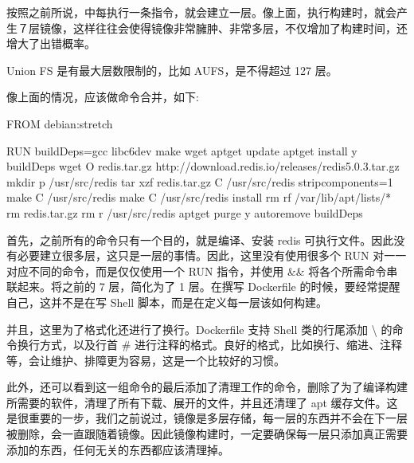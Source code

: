 \documentclass[letterpaper,10pt,english]{sphinxmanual}
\begin{document}
\begin{itemize}
按照之前所说，中每执行一条指令，就会建立一层。像上面，执行构建时，就会产生７层镜像，这样往往会使得镜像非常臃肿、非常多层，不仅增加了构建时间，还增大了出错概率。

Union FS 是有最大层数限制的，比如 AUFS，是不得超过 127 层。

像上面的情况，应该做命令合并，如下:

\begin{sphinxVerbatim}[commandchars=\\\{\}]
FROM debian:stretch

RUN buildDeps=\PYGZsq{}gcc libc6\PYGZhy{}dev make wget\PYGZsq{} \PYGZbs{}
    \PYGZam{}\PYGZam{} apt\PYGZhy{}get update \PYGZbs{}
    \PYGZam{}\PYGZam{} apt\PYGZhy{}get install \PYGZhy{}y \PYGZdl{}buildDeps \PYGZbs{}
    \PYGZam{}\PYGZam{} wget \PYGZhy{}O redis.tar.gz \PYGZdq{}http://download.redis.io/releases/redis\PYGZhy{}5.0.3.tar.gz\PYGZdq{} \PYGZbs{}
    \PYGZam{}\PYGZam{} mkdir \PYGZhy{}p /usr/src/redis \PYGZbs{}
    \PYGZam{}\PYGZam{} tar \PYGZhy{}xzf redis.tar.gz \PYGZhy{}C /usr/src/redis \PYGZhy{}\PYGZhy{}strip\PYGZhy{}components=1 \PYGZbs{}
    \PYGZam{}\PYGZam{} make \PYGZhy{}C /usr/src/redis \PYGZbs{}
    \PYGZam{}\PYGZam{} make \PYGZhy{}C /usr/src/redis install \PYGZbs{}
    \PYGZam{}\PYGZam{} rm \PYGZhy{}rf /var/lib/apt/lists/* \PYGZbs{}
    \PYGZam{}\PYGZam{} rm redis.tar.gz \PYGZbs{}
    \PYGZam{}\PYGZam{} rm \PYGZhy{}r /usr/src/redis \PYGZbs{}
    \PYGZam{}\PYGZam{} apt\PYGZhy{}get purge \PYGZhy{}y \PYGZhy{}\PYGZhy{}auto\PYGZhy{}remove \PYGZdl{}buildDeps
\end{sphinxVerbatim}

首先，之前所有的命令只有一个目的，就是编译、安装 redis 可执行文件。因此没有必要建立很多层，这只是一层的事情。因此，这里没有使用很多个 RUN 对一一对应不同的命令，而是仅仅使用一个 RUN 指令，并使用 \&\& 将各个所需命令串联起来。将之前的 7 层，简化为了 1 层。在撰写 Dockerfile 的时候，要经常提醒自己，这并不是在写 Shell 脚本，而是在定义每一层该如何构建。

并且，这里为了格式化还进行了换行。Dockerfile 支持 Shell 类的行尾添加 \textbackslash{} 的命令换行方式，以及行首 \# 进行注释的格式。良好的格式，比如换行、缩进、注释等，会让维护、排障更为容易，这是一个比较好的习惯。

此外，还可以看到这一组命令的最后添加了清理工作的命令，删除了为了编译构建所需要的软件，清理了所有下载、展开的文件，并且还清理了 apt 缓存文件。这是很重要的一步，我们之前说过，镜像是多层存储，每一层的东西并不会在下一层被删除，会一直跟随着镜像。因此镜像构建时，一定要确保每一层只添加真正需要添加的东西，任何无关的东西都应该清理掉。


\end{itemize}
\end{document}
